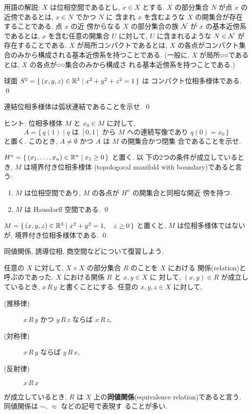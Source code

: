 \documentclass[12pt,twoside]{jarticle}
\def\R{{\Bbb R}} %
\begin{document}
\noindent 用語の解説: $X$ は位相空間であるとし, $x \in X$ とする. %
$X$ の部分集合 $N$ が点 $x$ の近傍であるとは, $x \in N$ でかつ $N$ に
含まれ $x$ を含むような $X$ の開集合が存在することである. 点 $x$ の近
傍からなる $X$ の部分集合の族 $\cal{N}$ が $x$ の基本近傍系であるとは,
$x$ を含む任意の開集合 $U$ に対して, $U$ に含まれるような %
$N \in \cal{N}$ が存在することである. $X$ が局所コンパクトであるとは,
$X$ の各点がコンパクト集合のみから構成される基本近傍系を持つことである.
(一般に, $X$ が局所○○であるとは, $X$ の各点が○○集合のみから構成さ
れる基本近傍系を持つことである.)

\begin{question}
  球面 $S^2 = \{\, (x,y,z) \in \R^3 \mid x^2 + y^2 + z^2 = 1 \,\}$ は
  コンパクト位相多様体である. \qed
\end{question}

\begin{question}
  連結位相多様体は弧状連結であることを示せ. \qed
\end{question}

\noindent ヒント: 位相多様体 $M$ と $x_0 \in M$ に対して, %
\[
  A
  =
  \{\,
    q(1) 
  \mid
    \text{$q$ は $[0,1]$ から $M$ への連続写像であり $q(0)=x_0$}
  \,\}
\] %
と置く. このとき, $A \ne \emptyset$ かつ $A$ は $M$ の開集合かつ閉集
合であることを示せ.

\begin{Definition}
  $H^n = \{\, (x_1,\dots,x_n) \in \R^n \mid x_1 \ge 0 \,\}$ と置く. 以
  下の2つの条件が成立しているとき, $M$ は境界付き位相多様体
  (topologocal manifold with boundary)であると言う:
  \begin{enumerate}
  \item $M$ は位相空間であり, $M$ の各点が $H^n$ の開集合と同相な開近
    傍を持つ.
  \item $M$ は Hausdorff 空間である.
    \qed
  \end{enumerate}
\end{Definition}

\begin{question}
  $M = \{ \, (x,y,z) \in \R^3 \mid x^2 + y^2 = 1,\quad z \ge 0 \,\}$ %
  と置くと, $M$ は位相多様体ではないが, 境界付き位相多様体である. \qed
\end{question}

同値関係, 誘導位相, 商空間などについて復習しよう.

任意の $X$ に対して, $X \times X$ の部分集合 $R$ のことを $X$ における
関係(relation)と呼ぶのであった. $X$ における関係 $R$ と $x,y\in X$ に
対して, $(x,y) \in R$ が成立しているとき, $x\,R\,y$ と書くことにする.
任意の $x,y,z\in X$ に対して,
\begin{description}
\item[(推移律)] $x\,R\,y$ かつ $y\,R\,z$ ならば $x\,R\,z$,
\item[(対称律)] $x\,R\,y$ ならば $y\,R\,x$,
\item[(反射律)] $x\,R\,x$
\end{description}
が成立しているとき, $R$ は $X$ 上の{\bf 同値関係}(equivalence
relation)であると言う. 同値関係は $\sim$, $\approx$ などの記号で表現す
ることが多い. 
\end{document}
